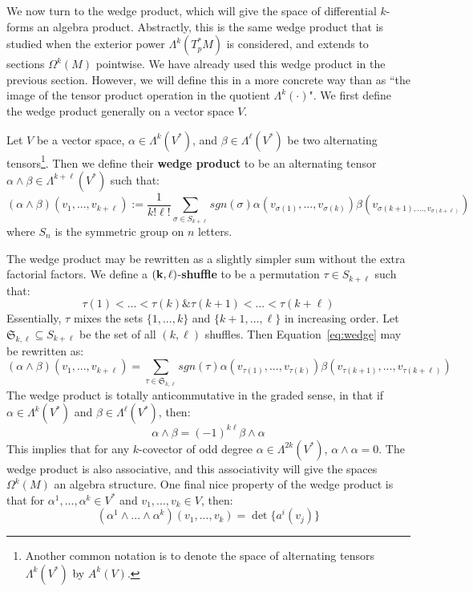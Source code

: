 We now turn to the wedge product, which will give the space of differential $k$-forms an algebra product. Abstractly, this 
is the same wedge product that is studied when the exterior power $\Lambda^k(T_p^* M)$ is considered, and extends 
to sections $\Omega^k(M)$ pointwise. We have already used this wedge product in the previous section. However, we will 
define this in a more concrete way than as ``the image of the tensor product operation in the quotient $\Lambda^k(\cdot)$". 
We first define the wedge product generally on a vector space $V$. 

\begin{definition}
	Let $V$ be a vector space, $\alpha\in\Lambda^k(V^*)$, and $\beta\in\Lambda^\ell(V^*)$ be two alternating 
	tensors\footnote{Another common notation is to denote the space of alternating tensors 
	$\Lambda^k(V^*)$ by $A^k(V)$.}. Then we define their \textbf{wedge product} to be an alternating tensor 
	$\alpha\wedge\beta\in\Lambda^{k + \ell}(V^*)$ such that:
	\begin{equation}
		(\alpha\wedge\beta)(v_1, ..., v_{k + \ell}) := \frac{1}{k!\ell!}\sum_{\sigma\in S_{k + \ell}}sgn(\sigma)
		\alpha(v_{\sigma(1)}, ..., v_{\sigma(k)})\beta(v_{\sigma(k + 1), ..., v_{\sigma(k + \ell)}})~
		\label{eq:wedge}
	\end{equation}
	where $S_n$ is the symmetric group on $n$ letters. 
\end{definition}

The wedge product may be rewritten as a slightly simpler sum without the extra factorial factors. We define a 
$\bf{(k, \ell)}$-\textbf{shuffle} to be a permutation $\tau\in S_{k + \ell}$ such that:
\begin{equation}
	\tau(1) < ... < \tau(k) \& \tau(k + 1) < ... < \tau(k + \ell)
\end{equation}
Essentially, $\tau$ mixes the sets $\{1, ..., k\}$ and $\{k + 1, ..., \ell\}$ in increasing order. Let $\mathfrak S_{k, \ell}\subseteq
S_{k + \ell}$ be the set of all $(k, \ell)$ shuffles. Then Equation~\ref{eq:wedge} may be rewritten as:
\begin{equation}
	(\alpha\wedge\beta)(v_1, ..., v_{k + \ell}) = \sum_{\tau\in\mathfrak S_{k, \ell}}sgn(\tau)\alpha(v_{\tau(1)}, ..., v_{\tau(k)})
	\beta(v_{\tau(k + 1)}, ..., v_{\tau(k + \ell)})
\end{equation}
The wedge product is totally anticommutative in the graded sense, in that if $\alpha\in\Lambda^k(V^*)$ and $\beta\in
\Lambda^\ell(V^*)$, then:
\begin{equation}
	\alpha\wedge\beta = (-1)^{k\ell}\beta\wedge\alpha
\end{equation}
This implies that for any $k$-covector of odd degree $\alpha\in\Lambda^{2k}(V^*)$, $\alpha\wedge\alpha = 0$. The wedge 
product is also associative, and this associativity will give the spaces $\Omega^k(M)$ an algebra structure. One final nice 
property of the wedge product is that for $\alpha^1, ..., \alpha^k\in V^*$ and $v_1, ..., v_k\in V$, then:
\begin{equation}
	(\alpha^1\wedge ...\wedge\alpha^k)(v_1, ..., v_k) = \det\{a^i(v_j)\}
\end{equation}

